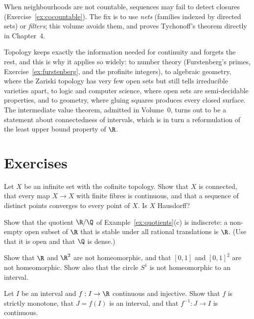 When neighbourhoods are not countable, sequences may fail to detect closures (Exercise~\ref{ex:cocountable}). The fix is to use \emph{nets}
(families indexed by directed sets) or \emph{filters}; this volume avoids them, and proves Tychonoff's theorem directly in Chapter~4.

\begin{beauty}
Topology keeps exactly the information needed for continuity and forgets the rest, and this is why it applies so
widely: to number theory (Furstenberg's primes, Exercise~\ref{ex:furstenberg}, and the profinite integers), to algebraic geometry,
where the Zariski topology has very few open sets but still tells irreducible varieties apart, to logic and computer
science, where open sets are semi-decidable properties, and to geometry, where gluing squares produces every closed
surface. The intermediate value theorem, admitted in Volume~0, turns out to be a statement about connectedness of
intervals, which is in turn a reformulation of the least upper bound property of $\R$.
\end{beauty}

\section{Exercises}

\begin{exercise}[$\star$]\label{ex:cofinite}
Let $X$ be an infinite set with the cofinite topology. Show that $X$ is connected, that every map $X\to X$ with finite fibres is continuous, and that a
sequence of distinct points converges to every point of $X$. Is $X$ Hausdorff?
\end{exercise}

\begin{exercise}[$\star$]\label{ex:RmodQ}
Show that the quotient $\R/\Q$ of Example~\ref{ex:quotients}(c) is indiscrete: a non-empty open subset of $\R$ that is stable under all rational
translations is $\R$. (Use that it is open and that $\Q$ is dense.)
\end{exercise}

\begin{exercise}[$\star\star$]\label{ex:notR2}
Show that $\R$ and $\R^2$ are not homeomorphic, and that $[0,1]$ and $[0,1]^2$ are not homeomorphic. Show also that the circle $S^1$ is not homeomorphic to
an interval.
\end{exercise}

\begin{exercise}[$\star\star$]\label{ex:monotone}
Let $I$ be an interval and $f:I\to\R$ continuous and injective. Show that $f$ is strictly monotone, that $J=f(I)$ is an interval, and that $f^{-1}:J\to I$ is
continuous.
\end{exercise}

